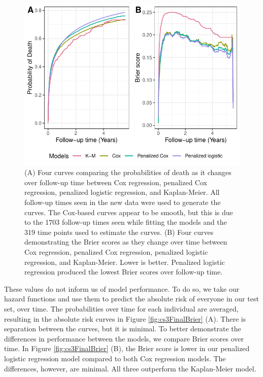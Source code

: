 \documentclass[
]{jss}
\begin{document}
\begin{CodeChunk}
\begin{figure}

{\centering \includegraphics[width=\textwidth,keepaspectratio=true]{../figures/riskregressionBrier-1} 

}

\caption{\label{fig:cs3FinalBrier} (A) Four curves comparing the probabilities of death as it changes over follow-up time between Cox regression, penalized Cox regression, penalized logistic regression, and Kaplan-Meier. All follow-up times seen in the new data were used to generate the curves. The Cox-based curves appear to be smooth, but this is due to the 1703 follow-up times seen while fitting the models and the 319 time points used to estimate the curves. (B) Four curves demonstrating the Brier scores as they change over time between Cox regression, penalized Cox regression, penalized logistic regression, and Kaplan-Meier. Lower is better. Penalized logistic regression produced the lowest Brier scores over follow-up time.}\label{fig:riskregressionBrier}
\end{figure}
\end{CodeChunk}

These values do not inform us of model performance. To do so, we take
our hazard functions and use them to predict the absolute risk of
everyone in our test set, over time. The probabilities over time for
each individual are averaged, resulting in the absolute risk curves in
Figure \ref{fig:cs3FinalBrier} (A). There is separation between the
curves, but it is minimal. To better demonstrate the differences in
performance between the models, we compare Brier scores over time. In
Figure \ref{fig:cs3FinalBrier} (B), the Brier score is lower in our
penalized logistic regression model compared to both Cox regression
models. The differences, however, are minimal. All three outperform the
Kaplan-Meier model.
\end{document}
